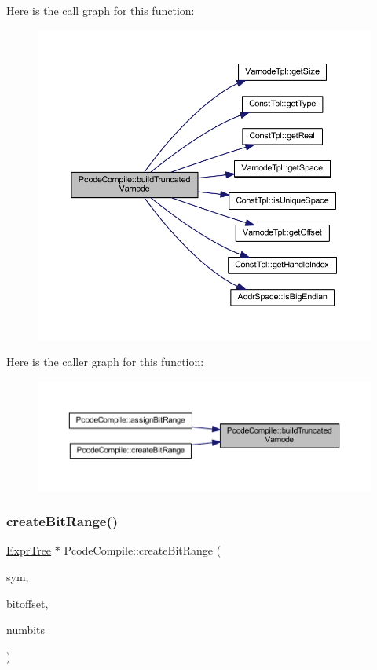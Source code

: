 Here is the call graph for this function\+:
\nopagebreak
\begin{figure}[H]
\begin{center}
\leavevmode
\includegraphics[width=350pt]{class_pcode_compile_ab334954dd18986dfe6623b905f540c13_cgraph}
\end{center}
\end{figure}
Here is the caller graph for this function\+:
\nopagebreak
\begin{figure}[H]
\begin{center}
\leavevmode
\includegraphics[width=350pt]{class_pcode_compile_ab334954dd18986dfe6623b905f540c13_icgraph}
\end{center}
\end{figure}
\mbox{\label{class_pcode_compile_a0f46346dc8f300f3ae8fe0b0f7b65e79}} 
\subsubsection{\texorpdfstring{createBitRange()}{createBitRange()}}
{\footnotesize\ttfamily \mbox{\hyperlink{class_expr_tree}{Expr\+Tree}} $\ast$ Pcode\+Compile\+::create\+Bit\+Range (\begin{DoxyParamCaption}\item[{\mbox{\hyperlink{class_specific_symbol}{Specific\+Symbol}} $\ast$}]{sym,  }\item[{uint4}]{bitoffset,  }\item[{uint4}]{numbits }\end{DoxyParamCaption})}



